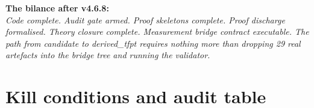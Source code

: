 \begin{tfptfrontbox}
\textbf{The bilance after v4.6.8:}\\
\emph{Code complete. Audit gate armed. Proof skeletons complete.
Proof discharge formalised. Theory closure complete. Measurement
bridge contract executable. The path from candidate to
derived\_tfpt requires nothing more than dropping 29 real artefacts
into the bridge tree and running the validator.}
\end{tfptfrontbox}

\section{Kill conditions and audit table}
\label{sec:kills}

